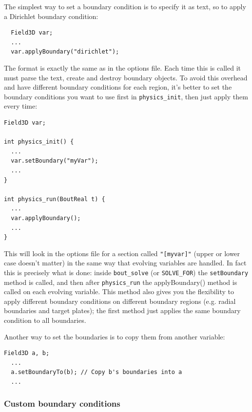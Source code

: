 \documentclass[12pt]{article}
\newcommand{\code}[1]{\texttt{#1}}
\begin{document}
The simplest way to set a boundary condition is to specify it as text,
so to apply a Dirichlet boundary condition:
\begin{lstlisting}
  Field3D var;
  ...
  var.applyBoundary("dirichlet");
\end{lstlisting}
The format is exactly the same as in the options file. Each time this is called it must
parse the text, create and destroy boundary objects. To avoid this overhead and have different
boundary conditions for each region, it's better to set the boundary conditions you want to use
first in \code{physics\_init}, then just apply them every time:
\begin{lstlisting}
Field3D var;

int physics_init() {
  ...
  var.setBoundary("myVar");
  ...
}

int physics_run(BoutReal t) {
  ...
  var.applyBoundary(); 
  ...
}
\end{lstlisting}
This will look in the options file for a section called \code{"[myvar]"}  (upper or lower case
doesn't matter) in the same way that evolving variables are handled. In fact this is precisely what
is done: inside \code{bout\_solve} (or \code{SOLVE\_FOR}) the \code{setBoundary} method is called,
and then after \code{physics\_run} the applyBoundary() method is called on each evolving variable.
This method also gives you the flexibility to apply different boundary conditions on different
boundary regions (e.g. radial boundaries and target plates); the first method just applies the same
boundary condition to all boundaries.

Another way to set the boundaries is to copy them from another variable:
\begin{lstlisting}
Field3D a, b;
  ...
  a.setBoundaryTo(b); // Copy b's boundaries into a
  ...
\end{lstlisting}

\subsubsection{Custom boundary conditions}
\end{document}
